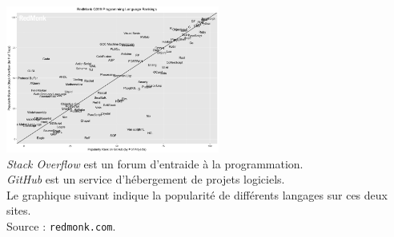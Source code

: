 \begin{center}
    \includegraphics[width=7cm]{ch-langages/img/rank.png}\\ \scriptsize    \textit{Stack Overflow} est un forum d'entraide à la programmation.\\ \textit{GitHub} est un service d'hébergement de projets logiciels.\\
    Le graphique suivant indique la popularité de différents langages sur ces deux sites.\\
    Source : \texttt{redmonk.com}.
\end{center}
